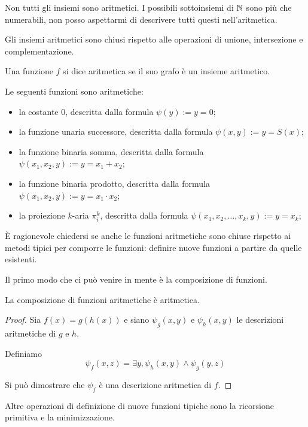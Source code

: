 Non tutti gli insiemi sono aritmetici. I possibili sottoinsiemi di $\mathbb{N}$ sono più che numerabili,
non posso aspettarmi di descrivere tutti questi nell'aritmetica.

Gli insiemi aritmetici sono chiusi rispetto alle operazioni di unione, intersezione
e complementazione.

\begin{defn}
    Una funzione $f$ si dice aritmetica se il suo grafo è un insieme aritmetico.
\end{defn}

Le seguenti funzioni sono aritmetiche:
\begin{itemize}
    \item la costante 0, descritta dalla formula $\psi(y) := y = 0$;
    \item la funzione unaria successore, descritta dalla formula $\psi(x,y) := y = S(x)$;
    \item la funzione binaria somma, descritta dalla formula $\psi(x_{1},x_{2},y) := y = x_{1} + x_{2}$;
    \item la funzione binaria prodotto, descritta dalla formula $\psi(x_{1},x_{2},y) := y = x_{1} \cdot x_{2}$;
    \item la proiezione $k$-aria $\pi_{i}^{k}$, descritta dalla formula $\psi(x_{1},x_{2},\dotsc,x_{k},y) :=
    y = x_{k}$;
\end{itemize}

È ragionevole chiedersi se anche le funzioni aritmetiche sono chiuse rispetto ai metodi tipici per
comporre le funzioni: definire nuove funzioni a partire da quelle esistenti.

Il primo modo che ci può venire in mente è la composizione di funzioni.

\begin{lem}
    La composizione di funzioni aritmetiche è aritmetica.
\end{lem}
\begin{proof}
    Sia $f(x) = g(h(x))$ e siano $\psi_{g}(x,y)$ e $\psi_{h}(x,y)$ le descrizioni aritmetiche di $g$
    e $h$.

    Definiamo
    \begin{equation*}
        \psi_{f}(x,z) = \exists y, \psi_{h}(x,y) \land \psi_{g}(y,z)
    \end{equation*}

    Si può dimostrare che $\psi_{f}$ è una descrizione aritmetica di $f$.
\end{proof}

Altre operazioni di definizione di nuove funzioni tipiche sono la ricorsione primitiva e la minimizzazione.

